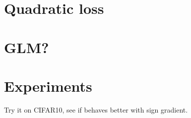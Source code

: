 \documentclass[12pt]{article}
\begin{document}
\section{Quadratic loss}

\section{GLM?}

\section{Experiments}
Try it on CIFAR10, see if behaves better with sign gradient.



%
%

% 
\end{document}
